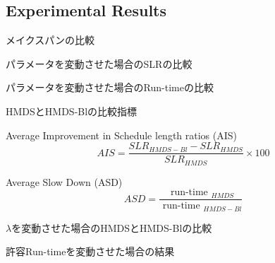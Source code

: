 \subsection{Experimental Results}
\label{ssec: Experimental Results}

\begin{frame}{メイクスパンの比較}
\end{frame}

\begin{frame}{パラメータを変動させた場合のSLRの比較}
\end{frame}

\begin{frame}{パラメータを変動させた場合のRun-timeの比較}
\end{frame}

\begin{frame}{HMDSとHMDS-Blの比較指標}
    \begin{block}{Average Improvement in Schedule length ratios (AIS)}
        \begin{equation*}
            A I S=\frac{S L R_{H M D S-B l}-S L R_{H M D S}}{S L R_{H M D S}} \times 100
        \end{equation*}
    \end{block}
    \begin{block}{Average Slow Down (ASD)}
        \begin{equation*}
            A S D=\frac{\text { run-time }_{H M D S}}{\text { run-time }_{H M D S-B l}}
        \end{equation*}
    \end{block}
\end{frame}

\begin{frame}{$\lambda$を変動させた場合のHMDSとHMDS-Blの比較}
\end{frame}

\begin{frame}{許容Run-timeを変動させた場合の結果}
\end{frame}
